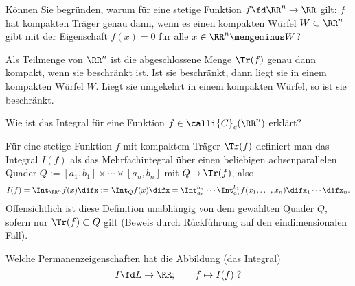 \begin{frage}
  K\"onnen Sie begr\"unden, warum f\"ur eine stetige 
  Funktion $f\fd \RR^n \to \RR$ gilt: 
  $f$ hat kompakten Tr\"ager genau dann, wenn es einen 
  kompakten W\"urfel $W\subset\RR^n$ gibt mit der 
  Eigenschaft $f(x)=0$ f\"ur alle $x\in\RR^n \mengeminus W$?
\end{frage}

\begin{antwort}
  Als Teilmenge von $\RR^n$ ist die abgeschlossene Menge $\Tr(f)$ genau 
  dann kompakt, wenn sie beschr\"ankt 
  ist. Ist sie beschr\"ankt, dann liegt sie in einem kompakten W\"urfel $W$. 
  Liegt sie umgekehrt in einem kompakten W\"urfel, so ist sie 
  beschr\"ankt. 
  \AntEnd
\end{antwort}

\begin{frage}
  Wie ist das Integral f\"ur eine Funktion $f\in\calli{C}_c (\RR^n)$ 
  erkl\"art?
\end{frage}

\begin{antwort}
  F\"ur eine stetige Funktion $f$ mit kompaktem Träger $\Tr(f)$ 
  definiert man das Integral $I(f)$ als das Mehrfachintegral über einen 
  beliebigen achsenparallelen Quader 
  $Q:= [a_1,b_1]\times\cdots\times [a_n,b_n]$ mit 
  $Q\supset \Tr(f)$, also  
  \[
  I(f) = \Int_{\RR^n} f(x) \difx := \Int_Q f(x) \difx
  =\Int_{a_n}^{b_n}\cdots \Int_{a_1}^{b_1}
  f(x_1,\ldots,x_n) \difx_1 \cdots \difx_n.
  \]
  Offensichtlich ist diese Definition unabhängig von dem gewählten 
  Quader $Q$, sofern nur $\Tr(f)\subset Q$ gilt (Beweis durch Rückführung 
  auf den eindimensionalen Fall).  
  \AntEnd  
\end{antwort} 

\begin{frage}\label{11_haupteigenschaft}
  Welche Permanenzeigenschaften hat die Abbildung (das Integral) 
  \[
  I \fd L \to \RR; \qquad f \mapsto I(f)\; \text{?}
  \]
\end{frage}

